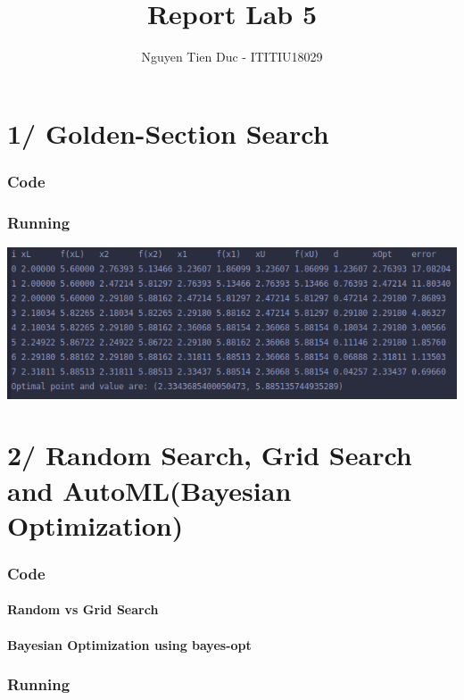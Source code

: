 \documentclass[12pt]{article}
\begin{document}
  \title{Report Lab 5}
  \author{Nguyen Tien Duc - ITITIU18029}
  \maketitle
  \part*{1/ Golden-Section Search}
    \section*{Code}
    \section*{Running}
    \begin{center}
      \includegraphics{../GoldenSectionSearch.png}
    \end{center}
  \part*{2/ Random Search, Grid Search and AutoML(Bayesian Optimization)}
    \section*{Code}
      \subsection*{Random vs Grid Search}
      \subsection*{Bayesian Optimization using bayes-opt}
    \section*{Running}
\end{document}
